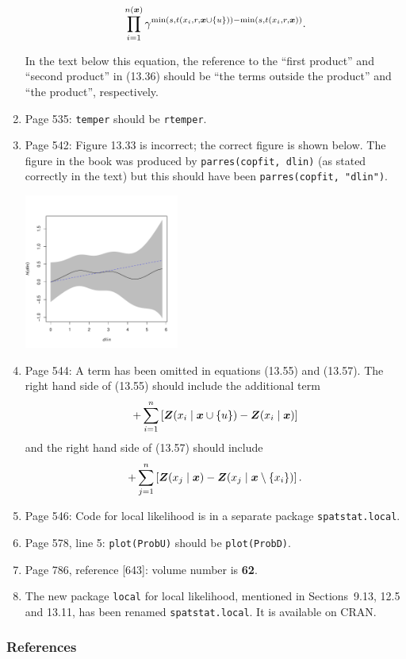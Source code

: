 \documentclass[12pt,a4paper]{article}
\newcommand{\boldmaths}[1]{{\ensuremath\boldsymbol{#1}}}
\newcommand{\bx}{\boldmaths x}
\newcommand{\bZ}{\boldmaths Z}
\begin{document}
\begin{enumerate}
\begin{large}
\[    \prod_{i=1}^{n(\bx)}
      \gamma^{
        \mbox{\scriptsize min} (s, t(x_i,r, \bx \cup \{u\}))
        - 
        \mbox{\scriptsize min} (s, t(x_i,r, \bx))
      }.
    \]
  \end{large}
  In the text below this equation, the reference to the ``first product''
  and ``second product'' in (13.36) should be
  ``the terms outside the product'' and ``the product'', respectively.
\item Page 535: \texttt{temper} should be \texttt{rtemper}.
\item Page 542: Figure 13.33 is incorrect; the correct figure is shown
  below. The figure in the book was produced by \texttt{parres(copfit, dlin)}
  (as stated correctly in the text)
  but this should have been \texttt{parres(copfit, "dlin")}.

  \centerline{\includegraphics*[width=0.4\textwidth]{fig1333}}
  
\item Page 544: A term has been omitted in equations (13.55) and (13.57).
The right hand side of (13.55) should include the additional term
\[
   + \sum_{i=1}^n \left[ \bZ(x_i \mid \bx \cup \{u\}) - \bZ(x_i \mid \bx) \right]
\]
and the right hand side of (13.57) should include
\[
  + \sum_{j=1}^n \left[ \bZ(x_j \mid \bx) - \bZ(x_j \mid \bx \setminus \{x_i\}) \right].
\]
\item Page 546: Code for local likelihood is in a separate package
  \texttt{spatstat.local}.
\item Page 578, line 5: \texttt{plot(ProbU)} should be \texttt{plot(ProbD)}.
\item Page 786, reference [643]: volume number is \textbf{62}.
\item
  The new package \texttt{local} for local likelihood, mentioned
  in Sections~9.13, 12.5 and 13.11, has been renamed \texttt{spatstat.local}.
  It is available on CRAN.
\end{enumerate}

\subsubsection*{References}
\end{document}
